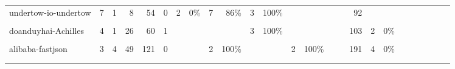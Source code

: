 \begin{table*}
{\begin{tabular}{lrrrr|rrrrrrrrrrr|rrrrrrrrr}
undertow-io-undertow&7&1&8&54&0&2&0\%&7&86\%&3&100\%& & & & &92& & & & & & & & \\
\cellcolor{gray!6}{orbit-orbit}&\cellcolor{gray!6}{7}&\cellcolor{gray!6}{7}&\cellcolor{gray!6}{420}&\cellcolor{gray!6}{2546}&\cellcolor{gray!6}{0}&\cellcolor{gray!6}{ }&\cellcolor{gray!6}{ }&\cellcolor{gray!6}{1}&\cellcolor{gray!6}{100\%}&\cellcolor{gray!6}{3}&\cellcolor{gray!6}{100\%}&\cellcolor{gray!6}{2}&\cellcolor{gray!6}{100\%}&\cellcolor{gray!6}{1}&\cellcolor{gray!6}{100\%}&\cellcolor{gray!6}{2721}&\cellcolor{gray!6}{214}&\cellcolor{gray!6}{1\%}&\cellcolor{gray!6}{5}&\cellcolor{gray!6}{20\%}&\cellcolor{gray!6}{ }&\cellcolor{gray!6}{ }&\cellcolor{gray!6}{ }&\cellcolor{gray!6}{ }\\
doanduyhai-Achilles&4&1&26&60&1& & & & &3&100\%& & & & &103&2&0\%& & & & & & \\
\cellcolor{gray!6}{elasticjob-elastic-job-lite}&\cellcolor{gray!6}{3}&\cellcolor{gray!6}{1}&\cellcolor{gray!6}{2}&\cellcolor{gray!6}{4}&\cellcolor{gray!6}{2}&\cellcolor{gray!6}{ }&\cellcolor{gray!6}{ }&\cellcolor{gray!6}{2}&\cellcolor{gray!6}{50\%}&\cellcolor{gray!6}{ }&\cellcolor{gray!6}{ }&\cellcolor{gray!6}{ }&\cellcolor{gray!6}{ }&\cellcolor{gray!6}{ }&\cellcolor{gray!6}{ }&\cellcolor{gray!6}{5}&\cellcolor{gray!6}{1}&\cellcolor{gray!6}{100\%}&\cellcolor{gray!6}{ }&\cellcolor{gray!6}{ }&\cellcolor{gray!6}{ }&\cellcolor{gray!6}{ }&\cellcolor{gray!6}{ }&\cellcolor{gray!6}{ }\\
alibaba-fastjson&3&4&49&121&0& & &2&100\%& & &2&100\%& & &191&4&0\%& & & & & & \\
\cellcolor{gray!6}{zxing-zxing}&\cellcolor{gray!6}{2}&\cellcolor{gray!6}{322}&\cellcolor{gray!6}{352}&\cellcolor{gray!6}{382}&\cellcolor{gray!6}{0}&\cellcolor{gray!6}{ }&\cellcolor{gray!6}{ }&\cellcolor{gray!6}{ }&\cellcolor{gray!6}{ }&\cellcolor{gray!6}{ }&\cellcolor{gray!6}{ }&\cellcolor{gray!6}{2}&\cellcolor{gray!6}{100\%}&\cellcolor{gray!6}{ }&\cellcolor{gray!6}{ }&\cellcolor{gray!6}{694}&\cellcolor{gray!6}{10}&\cellcolor{gray!6}{0\%}&\cellcolor{gray!6}{ }&\cellcolor{gray!6}{ }&\cellcolor{gray!6}{ }&\cellcolor{gray!6}{ }&\cellcolor{gray!6}{ }&\cellcolor{gray!6}{ }\\
\bottomrule
\label{tab:matchTable}
\end{tabular}
}
\end{table*}


